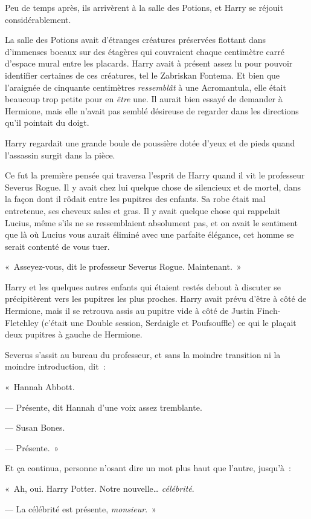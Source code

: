 Peu de temps après, ils arrivèrent à la salle des Potions, et Harry se réjouit considérablement.

La salle des Potions avait d'étranges créatures préservées flottant dans d'immenses bocaux sur des étagères qui couvraient chaque centimètre carré d'espace mural entre les placards.
Harry avait à présent assez lu pour pouvoir identifier certaines de ces créatures, tel le Zabriskan Fontema.
Et bien que l'araignée de cinquante centimètres \emph{ressemblât} à une Acromantula, elle était beaucoup trop petite pour en \emph{être} une.
Il aurait bien essayé de demander à Hermione, mais elle n'avait pas semblé désireuse de regarder dans les directions qu'il pointait du doigt.

Harry regardait une grande boule de poussière dotée d'yeux et de pieds quand l'assassin surgit dans la pièce.

Ce fut la première pensée qui traversa l'esprit de Harry quand il vit le professeur Severus Rogue.
Il y avait chez lui quelque chose de silencieux et de mortel, dans la façon dont il rôdait entre les pupitres des enfants.
Sa robe était mal entretenue, ses cheveux sales et gras.
Il y avait quelque chose qui rappelait Lucius, même s'ils ne se ressemblaient absolument pas, et on avait le sentiment que là où Lucius vous aurait éliminé avec une parfaite élégance, cet homme se serait contenté de vous tuer.

«~Asseyez-vous, dit le professeur Severus Rogue.
Maintenant.~»

Harry et les quelques autres enfants qui étaient restés debout à discuter se précipitèrent vers les pupitres les plus proches.
Harry avait prévu d'être à côté de Hermione, mais il se retrouva assis au pupitre vide à côté de Justin Finch-Fletchley (c'était une Double session, Serdaigle et Poufsouffle) ce qui le plaçait deux pupitres à gauche de Hermione.

Severus s'assit au bureau du professeur, et sans la moindre transition ni la moindre introduction, dit~:

«~Hannah Abbott.

--- Présente, dit Hannah d'une voix assez tremblante.

--- Susan Bones.

--- Présente.~»

Et ça continua, personne n'osant dire un mot plus haut que l'autre, jusqu'à~:

«~Ah, oui.
Harry Potter.
Notre nouvelle…
\emph{célébrité}.

--- La célébrité est présente, \emph{monsieur}.~»

